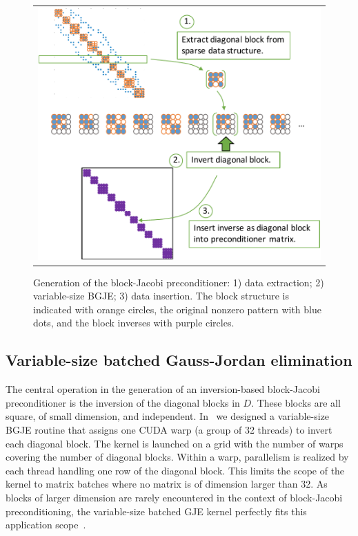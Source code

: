 \begin{figure}
\begin{center}
\begin{tabular}{c}
\includegraphics[width=.65\columnwidth]{plots/scheme_inversion}
\end{tabular}
\end{center}
\caption{Generation of the block-Jacobi preconditioner: 1) data extraction; 2) variable-size BGJE; 3) data insertion.
The block structure is indicated with orange circles, the original nonzero pattern with blue dots, 
    {and} the block inverses with purple circles.
}
\label{fig:batchedgje}
\end{figure}

\subsection{Variable-size batched Gauss-Jordan elimination}
\label{subsec:s3-inversion}

The central operation in the generation of an 
inversion-based block-Jacobi preconditioner
is the inversion of the diagonal blocks in $D$.
These blocks are all square, of small dimension, and independent.
In~\cite{Anzt:2017:BGE:3026937.3026940}
we designed a variable-size BGJE routine
that assigns one CUDA warp (a group of 32 threads) 
to invert each diagonal block.
The kernel is launched on a grid with the number of warps 
covering the number of diagonal blocks.
Within a warp, parallelism is realized by each thread handling one row
of the diagonal block.
This limits the scope of the kernel to matrix batches where no matrix
is of dimension larger than 32.
As blocks of larger dimension are rarely {encountered} in the context
of block-Jacobi preconditioning, the variable-size batched GJE
kernel perfectly fits this application scope~\cite{Anzt:2017:BGE:3026937.3026940}.

